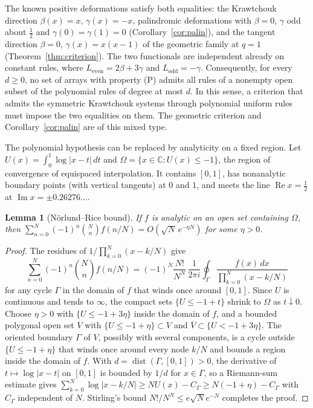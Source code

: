 \documentclass[twoside,10pt]{article}
\numberwithin{equation}{section}
\theoremstyle{slbody}
\newtheorem{lemma}[theorem]{Lemma}
\theoremstyle{definition}
\theoremstyle{remark}
\begin{document}
The known positive deformations satisfy both equalities: the Krawtchouk direction $\beta(x)=x$, $\gamma(x)=-x$, palindromic deformations with $\beta=0$, $\gamma$ odd about $\tfrac12$ and $\gamma(0)=\gamma(1)=0$ (Corollary~\ref{cor:palin}), and the tangent direction $\beta=0$, $\gamma(x)=x(x-1)$ of the geometric family at $q=1$ (Theorem~\ref{thm:criterion}). The two functionals are independent already on constant rules, where $L_{\mathrm{even}}=2\beta+3\gamma$ and $L_{\mathrm{odd}}=-\gamma$. Consequently, for every $d\geq0$, no set of arrays with property (P) admits all rules of a nonempty open subset of the polynomial rules of degree at most $d$. In this sense, a criterion that admits the symmetric Krawtchouk systems through polynomial uniform rules must impose the two equalities on them. The geometric criterion and Corollary~\ref{cor:palin} are of this mixed type.

The polynomial hypothesis can be replaced by analyticity on a fixed region. Let $U(x)=\int_0^1\log|x-t|\,dt$ and $\Omega=\{x\in\mathbb C:U(x)\leq-1\}$, the region of convergence of equispaced interpolation. It contains $[0,1]$, has nonanalytic boundary points (with vertical tangents) at $0$ and $1$, and meets the line $\operatorname{Re}x=\tfrac12$ at $\operatorname{Im}x=\pm0.26276\ldots$.

\begin{lemma}[N\"orlund--Rice bound]\label{lem:nr}
If $f$ is analytic on an open set containing $\Omega$, then $\sum_{n=0}^N(-1)^n\binom Nnf(n/N)=O(\sqrt N\,e^{-\eta N})$ for some $\eta>0$.
\end{lemma}
\begin{proof}
The residues of $1/\prod_{k=0}^N(x-k/N)$ give
\[
\sum_{n=0}^N(-1)^n\binom Nnf(n/N)=(-1)^N\frac{N!}{N^N}\,\frac1{2\pi i}\oint_\Gamma\frac{f(x)\,dx}{\prod_{k=0}^N(x-k/N)}
\]
for any cycle $\Gamma$ in the domain of $f$ that winds once around $[0,1]$. Since $U$ is continuous and tends to $\infty$, the compact sets $\{U\leq-1+t\}$ shrink to $\Omega$ as $t\downarrow0$. Choose $\eta>0$ with $\{U\leq-1+3\eta\}$ inside the domain of $f$, and a bounded polygonal open set $V$ with $\{U\leq-1+\eta\}\subset V$ and $\overline V\subset\{U<-1+3\eta\}$. The oriented boundary $\Gamma$ of $V$, possibly with several components, is a cycle outside $\{U\leq-1+\eta\}$ that winds once around every node $k/N$ and bounds a region inside the domain of $f$. With $d=\operatorname{dist}(\Gamma,[0,1])>0$, the derivative of $t\mapsto\log|x-t|$ on $[0,1]$ is bounded by $1/d$ for $x\in\Gamma$, so a Riemann-sum estimate gives $\sum_{k=0}^N\log|x-k/N|\geq NU(x)-C_\Gamma\geq N(-1+\eta)-C_\Gamma$ with $C_\Gamma$ independent of $N$. Stirling's bound $N!/N^N\leq e\sqrt Ne^{-N}$ completes the proof.
\end{proof}
\end{document}
